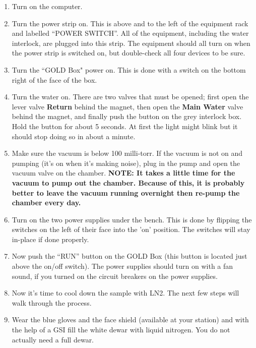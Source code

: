 \documentclass{../lab}
\begin{document}
\begin{enumerate}
    
    \item Turn on the computer.

    \item Turn the power strip on. This is above and to the left of the equipment rack and labelled ``POWER SWITCH''. All of the equipment, including the water interlock, are plugged into this strip. The equipment should all turn on when the power strip is switched on, but double-check all four devices to be sure.

    \item Turn the ``GOLD Box" power on. This is done with a switch on the bottom right of the face of the box.

    \item Turn the water on. There are two valves that must be opened; first open the lever valve \textbf{Return} behind the magnet, then open the \textbf{Main Water} valve behind the magnet, and finally push the button on the grey interlock box. Hold the button for about 5 seconds. At first the light might blink but it should stop doing so in about a minute.

    \item Make sure the vacuum is below 100 milli-torr. If the vacuum is not on and pumping (it's on when it's making noise), plug in the pump and open the vacuum valve on the chamber. \textbf{NOTE: It takes a little time for the vacuum to pump out the chamber. Because of this, it is probably better to leave the vacuum running overnight then re-pump the chamber every day.}

    \item Turn on the two power supplies under the bench. This is done by flipping the switches on the left of their face into the 'on' position. The switches will stay in-place if done properly.

    \item Now push the ``RUN'' button on the GOLD Box (this button is located just above the on/off switch). The power supplies should turn on with a fan sound, if you turned on the circuit breakers on the power supplies.

    \item Now it's time to cool down the sample with LN2. The next few steps will walk through the process.
    
    \item Wear the blue gloves and the face shield (available at your station) and with the help of a GSI fill the white dewar with liquid nitrogen. You do not actually need a full dewar.


\end{enumerate}
\end{document}

